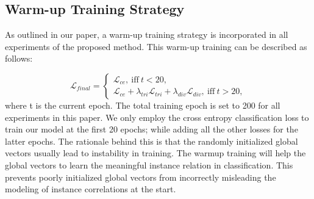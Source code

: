 \subsection{Warm-up Training Strategy}
\label{warmuptrainingstrategy}
As outlined in our paper, a warm-up training strategy is incorporated in all experiments of the proposed method. This warm-up training can be described as follows:

\begin{equation}
    \mathcal{L}_{final} = \begin{cases} \mathcal{L}_{ce} , \ \text{iff} \ t < 20, \\ \mathcal{L}_{ce} + \lambda_{tri} \mathcal{L}_{tri} + \lambda_{div}\mathcal{L}_{div}, \ \text{iff} \ t > 20, \end{cases}
    \label{eqn:1}
\end{equation}
where t is the current epoch. The total training epoch is set to 200  for all experiments in this paper. We only employ the cross entropy classification loss to train our model at the first 20 epochs; while adding all the other losses for the latter epochs. The rationale behind this is that the randomly initialized global vectors usually lead to instability in training. The warmup training will help the global vectors to learn the meaningful instance relation in classification. This prevents poorly initialized global vectors from incorrectly misleading the modeling of instance correlations at the start.

\begin{table}[t]
\centering
\caption{Comparision over efficiency among different transformer-based MIL aggregation methods in terms of the number of Parameters (M) and MACs (G) represent the model size and multiple-accumulated operation computational complexity, respectively.}
\label{computercomplexity}
\end{table} 



